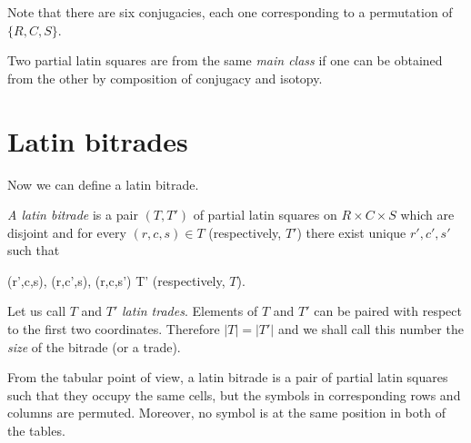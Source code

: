 Note that there are six conjugacies, each one corresponding to a permutation of $\{R,C,S\}$.

\begin{defn}
Two partial latin squares are from the same \emph{main class} if one can be obtained from the other by composition of conjugacy and isotopy.
\end{defn}


\section{Latin bitrades}
\label{sec:latin-bitrades}

Now we can define a latin bitrade.

\begin{defn}
\emph{A latin bitrade} is a pair $(T, T')$ of partial latin squares on $R \times C \times S$ which are disjoint and for every $(r,c,s) \in T$ (respectively, $T'$) there exist unique $r', c', s'$ such that
\begin{cosyeqnarray}
	(r',c,s), (r,c',s), (r,c,s') \in T' \textrm{ (respectively, $T$)}.
\end{cosyeqnarray}%
Let us call $T$ and $T'$ \emph{latin trades}. Elements of $T$ and $T'$ can be paired with respect to the first two coordinates. Therefore $|T| = |T'|$ and we shall call this number the \emph{size} of the bitrade (or a trade).
\end{defn}

From the tabular point of view, a latin bitrade is a pair of partial latin squares such that they occupy the same cells, but the symbols in corresponding rows and columns are permuted. Moreover, no symbol is at the same position in both of the tables.

